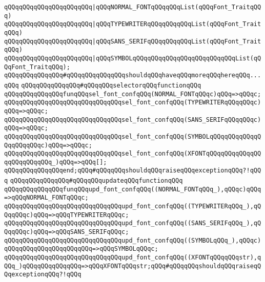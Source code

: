 \verb|qQQqqQQqqQQqqQQqqQQqqQQq|\verb#|qQQqNORMAL_FONTqQQqqQQqList(qQQqFont_TraitqQQq)#\newline
\verb|qQQqqQQqqQQqqQQqqQQqqQQq|\verb#|qQQqTYPEWRITERqQQqqQQqqQQqList(qQQqFont_TraitqQQq)#\newline
\verb|qQQqqQQqqQQqqQQqqQQqqQQq|\verb#|qQQqSANS_SERIFqQQqqQQqqQQqList(qQQqFont_TraitqQQq)#\newline
\verb|qQQqqQQqqQQqqQQqqQQqqQQq|\verb#|qQQqSYMBOLqQQqqQQqqQQqqQQqqQQqqQQqqQQqList(qQQqFont_TraitqQQq);#\newline
\verb|qQQqqQQqqQQqqQQq#qQQqqQQqqQQqqQQqshouldqQQqhaveqQQqmoreqQQqhereqQQq...qQQq|\newline
\newline
\newline
\verb|qQQqqQQqqQQqqQQq#qQQqqQQqselectorqQQqfunctionqQQq|\newline
\verb|qQQqqQQqqQQqqQQqfunqQQqsel_font_confqQQq(NORMAL_FONTqQQqc)qQQq=>qQQqc;|\newline
\verb|qQQqqQQqqQQqqQQqqQQqqQQqqQQqqQQqsel_font_confqQQq(TYPEWRITERqQQqqQQqc)qQQq=>qQQqc;|\newline
\verb|qQQqqQQqqQQqqQQqqQQqqQQqqQQqqQQqsel_font_confqQQq(SANS_SERIFqQQqqQQqc)qQQq=>qQQqc;|\newline
\verb|qQQqqQQqqQQqqQQqqQQqqQQqqQQqqQQqsel_font_confqQQq(SYMBOLqQQqqQQqqQQqqQQqqQQqqQQqc)qQQq=>qQQqc;|\newline
\verb|qQQqqQQqqQQqqQQqqQQqqQQqqQQqqQQqsel_font_confqQQq(XFONTqQQqqQQqqQQqqQQqqQQqqQQqqQQq_)qQQq=>qQQq[];|\newline
\verb|qQQqqQQqqQQqqQQqend;qQQq#qQQqqQQqshouldqQQqraiseqQQqexceptionqQQq?!qQQq|\newline
\newline
\verb|qQQqqQQqqQQqqQQq#qQQqqQQqupdateqQQqfunctionqQQq|\newline
\verb|qQQqqQQqqQQqqQQqfunqQQqupd_font_confqQQq((NORMAL_FONTqQQq_),qQQqc)qQQq=>qQQqNORMAL_FONTqQQqc;|\newline
\verb|qQQqqQQqqQQqqQQqqQQqqQQqqQQqqQQqupd_font_confqQQq((TYPEWRITERqQQq_),qQQqqQQqc)qQQq=>qQQqTYPEWRITERqQQqc;|\newline
\verb|qQQqqQQqqQQqqQQqqQQqqQQqqQQqqQQqupd_font_confqQQq((SANS_SERIFqQQq_),qQQqqQQqc)qQQq=>qQQqSANS_SERIFqQQqc;|\newline
\verb|qQQqqQQqqQQqqQQqqQQqqQQqqQQqqQQqupd_font_confqQQq((SYMBOLqQQq_),qQQqc)qQQqqQQqqQQqqQQqqQQqqQQq=>qQQqSYMBOLqQQqc;|\newline
\verb|qQQqqQQqqQQqqQQqqQQqqQQqqQQqqQQqupd_font_confqQQq((XFONTqQQqqQQqstr),qQQq_)qQQqqQQqqQQqqQQq=>qQQqXFONTqQQqstr;qQQq#qQQqqQQqshouldqQQqraiseqQQqexceptionqQQq?!qQQq|\newline
